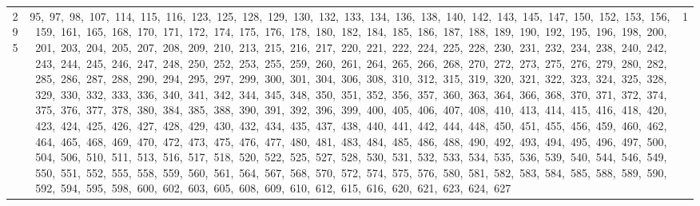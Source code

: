 \begin{longtable}{c|p{}|r}
295 & 95,\ 97,\ 98,\ 107,\ 114,\ 115,\ 116,\ 123,\ 125,\ 128,\ 129,\ 130,\ 132,\ 133,\ 134,\ 136,\ 138,\ 140,\ 142,\ 143,\ 145,\ 147,\ 150,\ 152,\ 153,\ 156,\ 159,\ 161,\ 165,\ 168,\ 170,\ 171,\ 172,\ 174,\ 175,\ 176,\ 178,\ 180,\ 182,\ 184,\ 185,\ 186,\ 187,\ 188,\ 189,\ 190,\ 192,\ 195,\ 196,\ 198,\ 200,\ 201,\ 203,\ 204,\ 205,\ 207,\ 208,\ 209,\ 210,\ 213,\ 215,\ 216,\ 217,\ 220,\ 221,\ 222,\ 224,\ 225,\ 228,\ 230,\ 231,\ 232,\ 234,\ 238,\ 240,\ 242,\ 243,\ 244,\ 245,\ 246,\ 247,\ 248,\ 250,\ 252,\ 253,\ 255,\ 259,\ 260,\ 261,\ 264,\ 265,\ 266,\ 268,\ 270,\ 272,\ 273,\ 275,\ 276,\ 279,\ 280,\ 282,\ 285,\ 286,\ 287,\ 288,\ 290,\ 294,\ 295,\ 297,\ 299,\ 300,\ 301,\ 304,\ 306,\ 308,\ 310,\ 312,\ 315,\ 319,\ 320,\ 321,\ 322,\ 323,\ 324,\ 325,\ 328,\ 329,\ 330,\ 332,\ 333,\ 336,\ 340,\ 341,\ 342,\ 344,\ 345,\ 348,\ 350,\ 351,\ 352,\ 356,\ 357,\ 360,\ 363,\ 364,\ 366,\ 368,\ 370,\ 371,\ 372,\ 374,\ 375,\ 376,\ 377,\ 378,\ 380,\ 384,\ 385,\ 388,\ 390,\ 391,\ 392,\ 396,\ 399,\ 400,\ 405,\ 406,\ 407,\ 408,\ 410,\ 413,\ 414,\ 415,\ 416,\ 418,\ 420,\ 423,\ 424,\ 425,\ 426,\ 427,\ 428,\ 429,\ 430,\ 432,\ 434,\ 435,\ 437,\ 438,\ 440,\ 441,\ 442,\ 444,\ 448,\ 450,\ 451,\ 455,\ 456,\ 459,\ 460,\ 462,\ 464,\ 465,\ 468,\ 469,\ 470,\ 472,\ 473,\ 475,\ 476,\ 477,\ 480,\ 481,\ 483,\ 484,\ 485,\ 486,\ 488,\ 490,\ 492,\ 493,\ 494,\ 495,\ 496,\ 497,\ 500,\ 504,\ 506,\ 510,\ 511,\ 513,\ 516,\ 517,\ 518,\ 520,\ 522,\ 525,\ 527,\ 528,\ 530,\ 531,\ 532,\ 533,\ 534,\ 535,\ 536,\ 539,\ 540,\ 544,\ 546,\ 549,\ 550,\ 551,\ 552,\ 555,\ 558,\ 559,\ 560,\ 561,\ 564,\ 567,\ 568,\ 570,\ 572,\ 574,\ 575,\ 576,\ 580,\ 581,\ 582,\ 583,\ 584,\ 585,\ 588,\ 589,\ 590,\ 592,\ 594,\ 595,\ 598,\ 600,\ 602,\ 603,\ 605,\ 608,\ 609,\ 610,\ 612,\ 615,\ 616,\ 620,\ 621,\ 623,\ 624,\ 627 & 1 \\

\end{longtable}

